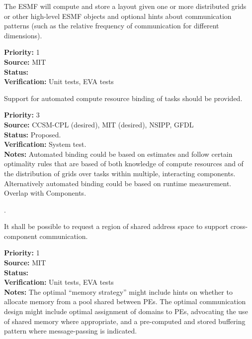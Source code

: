 The ESMF will compute and store a layout given one or more 
distributed grids or other high-level ESMF objects and optional 
hints about communication patterns (such as the relative 
frequency of communication for different dimensions).
\begin{reqlist}
  {\bf Priority:} 1 \\
  {\bf Source:}  MIT \\
  {\bf Status:}  \\
  {\bf Verification:} Unit tests, EVA tests \\
\end{reqlist}

Support for automated compute resource binding of tasks should
  be provided.
\begin{reqlist}
{\bf Priority:} 3 \\
{\bf Source:}  CCSM-CPL (desired), MIT (desired), NSIPP, GFDL \\
{\bf Status:} Proposed. \\
{\bf Verification:} System test.\\ 
{\bf Notes:}  Automated binding could be based on estimates and follow
  certain optimality rules that are based of both knowledge of compute
  resources and of the distribution of grids over tasks within
  multiple, interacting components.  Alternatively automated binding
  could be based on runtime measurement.  Overlap with Components.
\end{reqlist}

.

It shall be possible to request a region of shared address space to support
cross-component communication.

\begin{reqlist}
  {\bf Priority:} 1 \\
  {\bf Source:}  MIT \\
  {\bf Status:}  \\
  {\bf Verification:} Unit tests, EVA tests \\
  {\bf Notes:} The optimal ``memory strategy'' might include hints on
  whether to allocate memory from a pool shared between PEs. The
  optimal communication design might include optimal assignment of
  domains to PEs, advocating the use of shared memory where
  appropriate, and a pre-computed and stored buffering pattern where
  message-passing is indicated.  
\end{reqlist}

